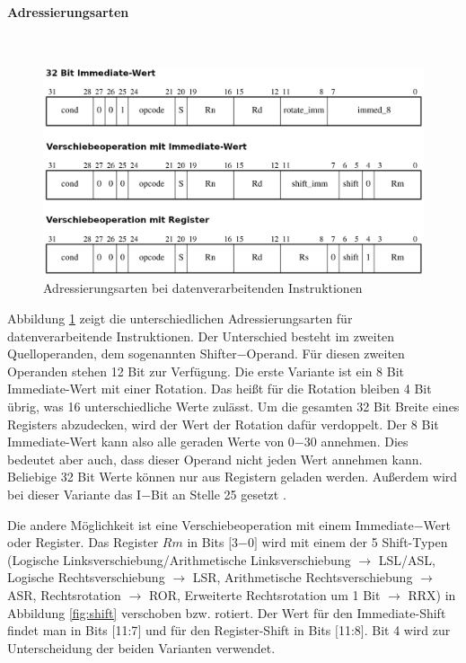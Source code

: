 \documentclass[a4paper, 11pt, onecolumn]{article}
\begin{document}
\paragraph{Adressierungsarten}\label{sec:dataInstAddr}
~\\
\begin{figure}[!htb]
\centering
\includegraphics[width=1\textwidth]{data/dataInstAddr}
\caption{Adressierungsarten bei datenverarbeitenden Instruktionen \cite{arm:2005}}
\label{fig:dataInstAddr}
\end{figure}

Abbildung \ref{fig:dataInstAddr} zeigt die unterschiedlichen Adressierungsarten für datenverarbeitende Instruktionen. Der Unterschied besteht im zweiten Quelloperanden, dem sogenannten Shifter$-$Operand. Für diesen zweiten Operanden stehen 12 Bit zur Verfügung. Die erste Variante ist ein 8 Bit Immediate-Wert mit einer Rotation. Das heißt für die Rotation bleiben 4 Bit übrig, was 16 unterschiedliche Werte zulässt. Um die gesamten 32 Bit Breite eines Registers abzudecken, wird der Wert der Rotation dafür verdoppelt. Der 8 Bit Immediate-Wert kann also alle geraden Werte von 0$-$30 annehmen. Dies bedeutet aber auch, dass dieser Operand nicht jeden Wert annehmen kann. Beliebige 32 Bit Werte können nur aus Registern geladen werden. Außerdem wird bei dieser Variante das I$-$Bit an Stelle 25 gesetzt \cite{arm:2005}.

Die andere Möglichkeit ist eine Verschiebeoperation mit einem Immediate$-$Wert oder Register. Das Register $Rm$ in Bits $[$3$-$0$]$ wird mit einem der 5 Shift-Typen (Logische Linksverschiebung/Arithmetische Linksverschiebung $\rightarrow$ LSL/ASL, Logische Rechtsverschiebung $\rightarrow$ LSR, Arithmetische Rechtsverschiebung $\rightarrow$ ASR, Rechtsrotation $\rightarrow$ ROR, Erweiterte Rechtsrotation um 1 Bit $\rightarrow$ RRX) in Abbildung \ref{fig:shift} verschoben bzw. rotiert. Der Wert für den Immediate-Shift findet man in Bits $[$11:7$]$ und für den Register-Shift in Bits $[$11:8$]$. Bit 4 wird zur Unterscheidung der beiden Varianten verwendet.
\end{document}
